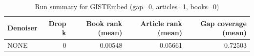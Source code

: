 \begin{table}
\caption{Run summary for GISTEmbed (gap=0, articles=1, books=0)}
\label{tab:summary_gap0_gistembed_a1_b0}
\begin{tabular}{lrrrr}
\toprule
Denoiser & Drop k & Book rank (mean) & Article rank (mean) & Gap coverage (mean) \\
\midrule
NONE & 0 & 0.00548 & 0.05661 & 0.72503 \\
\bottomrule
\end{tabular}
\end{table}